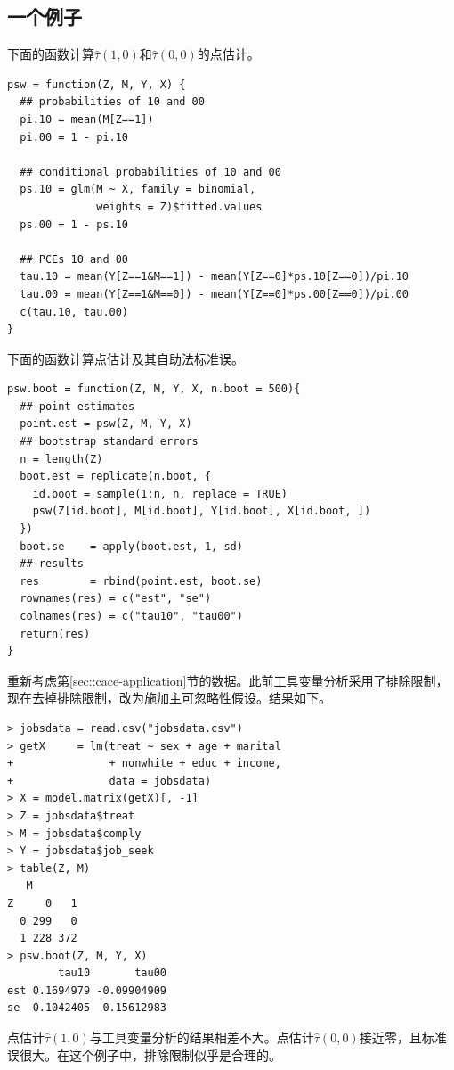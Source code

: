  
 
 
 \subsection{一个例子}

下面的函数计算$\hat \tau(1,0) $和$\hat \tau(0,0) $的点估计。 

  \begin{lstlisting}
psw = function(Z, M, Y, X) {
  ## probabilities of 10 and 00
  pi.10 = mean(M[Z==1])
  pi.00 = 1 - pi.10
  
  ## conditional probabilities of 10 and 00
  ps.10 = glm(M ~ X, family = binomial, 
              weights = Z)$fitted.values
  ps.00 = 1 - ps.10
  
  ## PCEs 10 and 00 
  tau.10 = mean(Y[Z==1&M==1]) - mean(Y[Z==0]*ps.10[Z==0])/pi.10
  tau.00 = mean(Y[Z==1&M==0]) - mean(Y[Z==0]*ps.00[Z==0])/pi.00
  c(tau.10, tau.00)
}
   \end{lstlisting}

下面的函数计算点估计及其自助法标准误。
  \begin{lstlisting}
psw.boot = function(Z, M, Y, X, n.boot = 500){
  ## point estimates
  point.est = psw(Z, M, Y, X)
  ## bootstrap standard errors
  n = length(Z)  
  boot.est = replicate(n.boot, {
    id.boot = sample(1:n, n, replace = TRUE)
    psw(Z[id.boot], M[id.boot], Y[id.boot], X[id.boot, ])
  })
  boot.se    = apply(boot.est, 1, sd)
  ## results
  res        = rbind(point.est, boot.se)
  rownames(res) = c("est", "se")
  colnames(res) = c("tau10", "tau00")
  return(res)
}
    \end{lstlisting}
    
    
重新考虑第\ref{sec::cace-application}节的数据。此前工具变量分析采用了排除限制，现在去掉排除限制，改为施加主可忽略性假设。结果如下。 


 \begin{lstlisting}
> jobsdata = read.csv("jobsdata.csv")
> getX     = lm(treat ~ sex + age + marital 
+               + nonwhite + educ + income,
+               data = jobsdata)
> X = model.matrix(getX)[, -1]
> Z = jobsdata$treat
> M = jobsdata$comply
> Y = jobsdata$job_seek
> table(Z, M)
   M
Z     0   1
  0 299   0
  1 228 372
> psw.boot(Z, M, Y, X)
        tau10       tau00
est 0.1694979 -0.09904909
se  0.1042405  0.15612983
\end{lstlisting}
        

点估计$\hat \tau(1,0) $与工具变量分析的结果相差不大。点估计$\hat \tau(0,0) $接近零，且标准误很大。在这个例子中，排除限制似乎是合理的。 
        
